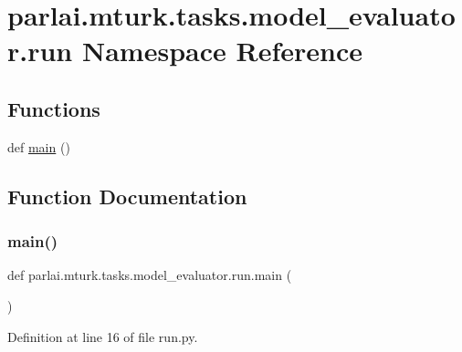 \hypertarget{namespaceparlai_1_1mturk_1_1tasks_1_1model__evaluator_1_1run}{}\section{parlai.\+mturk.\+tasks.\+model\+\_\+evaluator.\+run Namespace Reference}
\label{namespaceparlai_1_1mturk_1_1tasks_1_1model__evaluator_1_1run}
\subsection*{Functions}
\begin{DoxyCompactItemize}
\item 
def \hyperlink{namespaceparlai_1_1mturk_1_1tasks_1_1model__evaluator_1_1run_a0884addf15be92fa845f1fd80d057184}{main} ()
\end{DoxyCompactItemize}


\subsection{Function Documentation}
\mbox{\label{namespaceparlai_1_1mturk_1_1tasks_1_1model__evaluator_1_1run_a0884addf15be92fa845f1fd80d057184}} 
\subsubsection{\texorpdfstring{main()}{main()}}
{\footnotesize\ttfamily def parlai.\+mturk.\+tasks.\+model\+\_\+evaluator.\+run.\+main (\begin{DoxyParamCaption}{ }\end{DoxyParamCaption})}



Definition at line 16 of file run.\+py.


